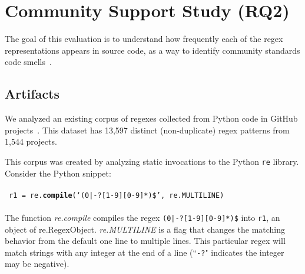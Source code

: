 \section{Community Support Study (RQ2)}
\label{sec:rq2}
The goal of this evaluation is to understand how frequently each of the regex representations appears in source code, as a way to identify community standards code smells~\cite{stoleeicse, stoleeTSE}. %



\subsection{Artifacts}
We analyzed an existing
corpus of regexes collected from Python code in GitHub projects~\cite{chapman2016}.
This dataset has 13,597 distinct (non-duplicate) regex patterns from 1,544 projects.

This corpus was created by analyzing static invocations to the Python {\tt re} library.
Consider the Python snippet:
\\{\footnotesize ~}\\
{\tt \footnotesize
r1 = re.\textbf{compile}(`(0|-?[1-9][0-9]*)\$', re.MULTILINE)}
\\{\footnotesize ~}\\
The function \emph{re.compile} compiles the regex \texttt{\justify(0|-?[1-9][0-9]*)\$} into \verb!r1!, an object of re.RegexObject. \emph{re.MULTILINE} is a flag that changes the matching behavior from the default one line to multiple lines. 
This particular regex will match strings with any integer at the end of a line (``\verb!-?!" indicates the integer may be negative).


